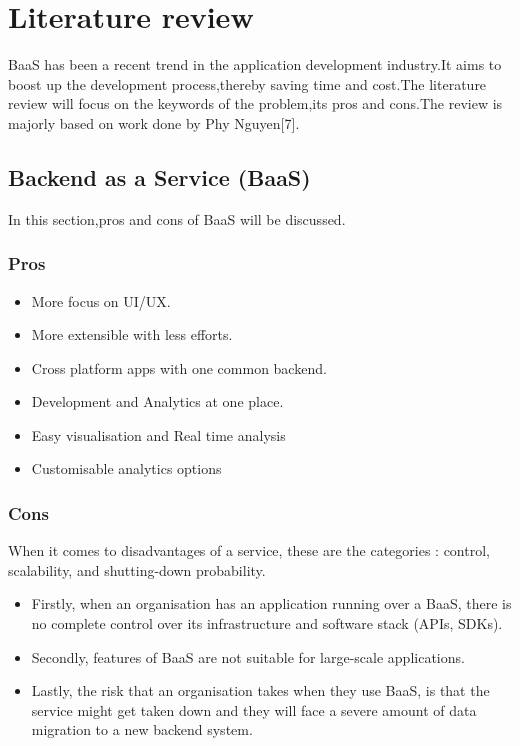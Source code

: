 \documentclass[a4paper,12pt]{report}
\begin{document}
    \section{Literature review}
    BaaS has been a recent trend in the application development industry.It aims to boost up the development process,thereby saving time and cost.The literature review will focus on the keywords of the problem,its pros and cons.The review is majorly based on work done by Phy Nguyen[7].
    
    \subsection{Backend as a Service (BaaS)}
    In this section,pros and cons of BaaS will be discussed. 
    \subsubsection{Pros}
    \begin{itemize}
      \item More focus on UI/UX.
      \item More extensible with less efforts.
      \item Cross platform apps with one common backend.
      \item Development and Analytics at one place.
      \item Easy visualisation and Real time analysis      
      \item Customisable analytics options      
      \end{itemize}
      \subsubsection{Cons} 
      When it comes to disadvantages of a service, these are the categories :  control, scalability, and shutting-down probability. 
      \begin{itemize}
        \item Firstly, when an organisation has an application running over a BaaS, there is no complete control over its infrastructure and software stack (APIs, SDKs). 
        \item Secondly, features of BaaS are not suitable for large-scale applications. 
        \item Lastly, the risk that an organisation takes when they use BaaS, is that the service might get taken down and they will face a severe amount of data migration to a new backend system.
      \end{itemize}   
    
\end{document}
